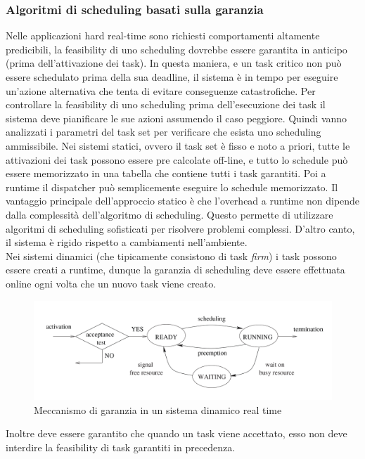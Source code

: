 \documentclass[12pt]{article}
\begin{document}
\subsubsection{Algoritmi di scheduling basati sulla garanzia}
Nelle applicazioni hard real-time sono richiesti comportamenti altamente predicibili, la feasibility di uno scheduling dovrebbe essere garantita in anticipo (prima dell'attivazione dei task).
In questa maniera, e un task critico non può essere schedulato prima della sua deadline, il sistema è in tempo per eseguire un'azione alternativa che tenta di evitare conseguenze catastrofiche.
Per controllare la feasibility di uno scheduling prima dell'esecuzione dei task il sistema deve pianificare le sue azioni assumendo il caso peggiore.
Quindi vanno analizzati i parametri del task set per verificare che esista uno scheduling ammissibile.
Nei sistemi statici, ovvero il task set è fisso e noto a priori, tutte le attivazioni dei task possono essere pre calcolate off-line, e tutto lo schedule può essere memorizzato in una tabella che contiene tutti i task garantiti.
Poi a runtime il dispatcher può semplicemente eseguire lo schedule memorizzato. Il vantaggio principale dell'approccio statico è che l'overhead a runtime non dipende dalla complessità dell'algoritmo di scheduling.
Questo permette di utilizzare algoritmi di scheduling sofisticati per risolvere problemi complessi. D'altro canto, il sistema è rigido rispetto a cambiamenti nell'ambiente.\\
Nei sistemi dinamici (che tipicamente consistono di task \textit{firm}) i task possono essere creati a runtime, dunque la garanzia di scheduling deve essere effettuata online ogni volta che un nuovo task viene creato.
\begin{figure}[H]
    \centering
    \includegraphics[width=\textwidth]{pictures/garanziaDinamica.png}
    \caption{Meccanismo di garanzia in un sistema dinamico real time}
\end{figure}
\noindent Inoltre deve essere garantito che quando un task viene accettato, esso non deve interdire la feasibility di task garantiti in precedenza.
\end{document}
